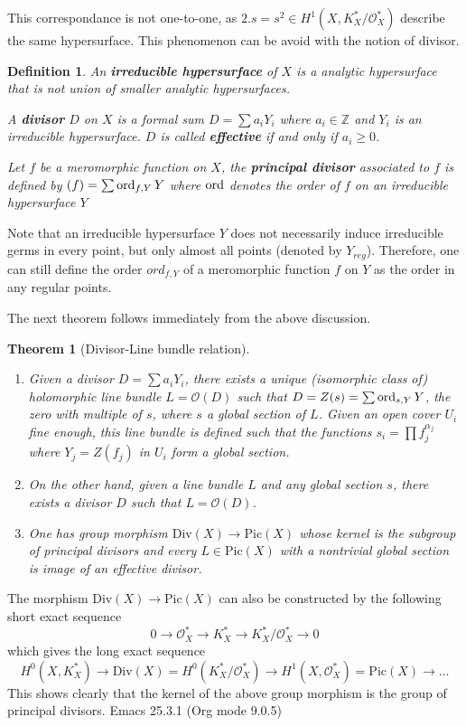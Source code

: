 \documentclass[11pt]{article}
\newtheorem{theorem}{Theorem}
\newtheorem{definition}{Definition}
\newcommand{\ord}{\mathop{\rm ord}\nolimits}
\begin{document}
This correspondance is not one-to-one, as \(2.s = s^2 \in H^1(X, K^*_X/\mathcal{O}_X^*)\) describe the same hypersurface. This phenomenon can be avoid with the notion of
divisor.

\begin{definition}
An \textbf{irreducible hypersurface} of \(X\) is a analytic hypersurface that is not union of
smaller analytic hypersurfaces.

A \textbf{divisor} \(D\) on \(X\) is a formal sum \(D = \sum a_i Y_i\) where \(a_i\in
\mathbb{Z}\) and \(Y_i\) is an irreducible hypersurface. \(D\) is called \textbf{effective}
if and only if \(a_i \geq 0\).

Let \(f\) be a meromorphic function on \(X\), the \textbf{principal divisor} associated to \(f\) is defined by \((f) = \sum \ord_{f,Y}Y\) where \(\ord\) denotes the order of \(f\) on an irreducible hypersurface \(Y\)
\end{definition}

Note that an irreducible hypersurface \(Y\) does not necessarily induce irreducible
germs in every point, but only almost all points (denoted by \(Y_{reg}\)). Therefore, one
can still define the order \(ord_{f,Y}\) of a meromorphic function \(f\) on \(Y\) as
the order in any regular points.

The next theorem follows immediately from the above discussion.
\begin{theorem}[Divisor-Line bundle relation]
\label{thm:div-pic-rel}
\begin{enumerate}
\item Given a divisor \(D = \sum a_i Y_i\), there exists a unique (isomorphic class of)
holomorphic line bundle \(L = \mathcal{O}(D)\) such that \(D =Z(s) = \sum \ord_{s,Y} Y\), the zero with
multiple of \(s\), where \(s\) a global section of \(L\). Given an open cover \(U_i\) fine enough, this line bundle is defined such that the functions \(s_i = \prod
   f_j^{\alpha_j}\) where \(Y_j = Z(f_j)\) in \(U_i\) form a global section.
\item On the other hand, given a line bundle \(L\) and any global section \(s\), there
exists a divisor \(D\) such that \(L = \mathcal{O}(D)\).
\item One has group morphism \(\text{Div}(X) \longrightarrow \text{Pic}(X)\) whose kernel
is the subgroup of principal divisors and every \(L\in \text{Pic}(X)\) with a
nontrivial global section is image of an effective divisor.
\end{enumerate}
\end{theorem}

The morphism \(\text{Div}(X) \longrightarrow \text{Pic}(X)\) can also be constructed by
the following short exact sequence
\[
0 \longrightarrow \mathcal{O}_X^* \longrightarrow K_X^* \longrightarrow K_X^*/
\mathcal{O}_X^* \longrightarrow 0
\]
which gives the long exact sequence
\[
H^0(X,K_X^*) \longrightarrow \text{Div}(X) = H^0(K_X^*/\mathcal{O}_X^*) \longrightarrow
H^1(X, \mathcal{O}_X^*) = \text{Pic}(X) \longrightarrow \dots
\]
This shows clearly that the kernel of the above group morphism is the group of principal divisors.
Emacs 25.3.1 (Org mode 9.0.5)
\end{document}
